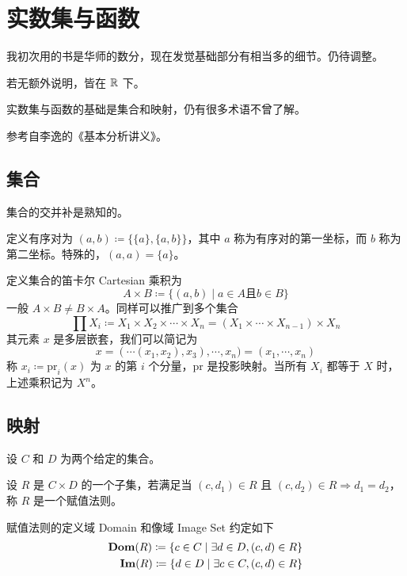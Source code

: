 \chapter{实数集与函数}

我初次用的书是华师的数分，现在发觉基础部分有相当多的细节。仍待调整。

若无额外说明，皆在 $\mathbb{R}$ 下。

实数集与函数的基础是集合和映射，仍有很多术语不曾了解。

参考自李逸的《基本分析讲义》。

\section{集合}

集合的交并补是熟知的。

定义有序对为 $(a,b) \coloneqq  \{\{a\},\{a,b\}\}$，其中 $a$ 称为有序对的第一坐标，而 $b$ 称为第二坐标。特殊的，$(a,a) = \{a\}$。

定义集合的笛卡尔 Cartesian 乘积为
$$A \times B \coloneqq  \{(a,b) \mid a\in A \text{且} b\in B\}$$
一般 $A \times B \ne B \times A$。同样可以推广到多个集合
$$\prod X_i \coloneqq  X_1 \times X_2 \times \cdots \times X_n = (X_1 \times \cdots \times X_{n-1}) \times X_n$$
其元素 $x$ 是多层嵌套，我们可以简记为
$$x = (\cdots(x_1,x_2),x_3),\cdots,x_n) = (x_1,\cdots,x_n)$$
称 $x_i \coloneqq  \mathrm{pr}_i(x)$ 为 $x$ 的第 $i$ 个分量，$\mathrm{pr}$ 是投影映射。当所有 $X_i$ 都等于 $X$ 时，上述乘积记为 $X^n$。

\section{映射}

设 $C$ 和 $D$ 为两个给定的集合。

\begin{definition}[赋值法则]
	设 $R$ 是 $C\times D$ 的一个子集，若满足当 $(c,d_1)\in R$ 且 $(c,d_2)\in R \Rightarrow d_1=d_2$，称 $R$ 是一个赋值法则。
\end{definition}

赋值法则的定义域 Domain 和像域 Image Set 约定如下
\begin{equation*}
	\begin{aligned}
		\operatorname{\mathbf{Dom}}(R) \coloneqq  \{c\in C \mid \exists d \in D, (c,d) \in R\}\\
		\operatorname{\mathbf{Im}}(R) \coloneqq  \{d\in D \mid \exists c \in C, (c,d) \in R\}\\
	\end{aligned}
\end{equation*}


